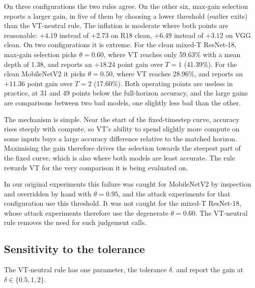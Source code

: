 On three configurations the two rules agree. On the other six, max-gain selection reports a larger gain, in five of them by choosing a lower threshold (earlier exits) than the VT-neutral rule. The inflation is moderate where both points are reasonable: $+4.19$ instead of $+2.73$ on R18 clean, $+6.49$ instead of $+3.12$ on VGG clean. On two configurations it is extreme. For the clean mixed-T ResNet-18, max-gain selection picks $\theta = 0.60$, where VT reaches only 59.63\% with a mean depth of 1.38, and reports an $+18.24$ point gain over $T = 1$ (41.39\%). For the clean MobileNetV2 it picks $\theta = 0.50$, where VT reaches 28.96\%, and reports an $+11.36$ point gain over $T = 2$ (17.60\%). Both operating points are useless in practice, at 31 and 49 points below the full-horizon accuracy, and the large gains are comparisons between two bad models, one slightly less bad than the other.

The mechanism is simple. Near the start of the fixed-timestep curve, accuracy rises steeply with compute, so VT's ability to spend slightly more compute on some inputs buys a large accuracy difference relative to the matched horizon. Maximising the gain therefore drives the selection towards the steepest part of the fixed curve, which is also where both models are least accurate. The rule rewards VT for the very comparison it is being evaluated on.

In our original experiments this failure was caught for MobileNetV2 by inspection and overridden by hand with $\theta = 0.95$, and the attack experiments for that configuration use this threshold. It was not caught for the mixed-T ResNet-18, whose attack experiments therefore use the degenerate $\theta = 0.60$. The VT-neutral rule removes the need for such judgement calls.

\subsection{Sensitivity to the tolerance}

The VT-neutral rule has one parameter, the tolerance $\delta$.  and  report the gain at $\delta \in \{0.5, 1, 2\}$.

